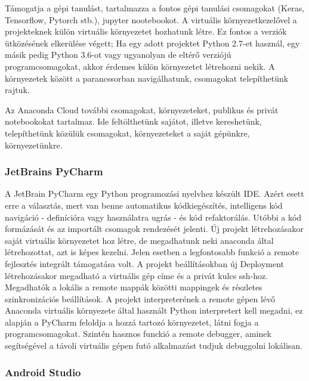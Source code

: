 Támogatja a gépi tanulást, tartalmazza a fontos gépi tanulási csomagokat (Keras, Tensorflow, Pytorch stb.), jupyter nootebookot. A virtuális környezetkezelővel a projekteknek külön virtuális környezetet hozhatunk létre. Ez fontos a verziók ütközésének elkerülése végett; Ha egy adott projektet Python 2.7-et használ, egy másik pedig Python 3.6-ot vagy ugyanolyan de eltérő verziójú programcsomagokat, akkor érdemes külön környezetet létrehozni nekik. A környezetek között a parancssorban navigálhatunk, csomagokat telepíthetünk rajtuk.

Az Anaconda Cloud további csomagokat, környezeteket, publikus és privát notebookokat tartalmaz. Ide feltölthetünk sajátot, illetve kereshetünk, telepíthetünk közülük csomagokat, környezeteket a saját gépünkre, környezetünkre.

\subsubsection{JetBrains PyCharm}

A JetBrain PyCharm egy Python programozási nyelvhez készült IDE. Azért esett erre a választás, mert van benne automatikus kódkiegészítés, intelligens kód navigáció - definícióra vagy használatra ugrás - és kód refaktorálás. Utóbbi a kód formázását és az importált csomagok rendezését jelenti.
\newline
\newline
Új projekt létrehozásakor saját virtuális környezetet hoz létre, de megadhatunk neki anaconda által létrehozottat, azt is képes kezelni. Jelen esetben a legfontosabb funkció a remote fejlesztés integrált támogatása volt.
\newline
\newline
A projekt beállításokban új Deployment létrehozásakor megadható a virtuális gép címe és a privát kulcs ssh-hoz. Megadhatók a lokális a remote mappák közötti mappingek és részletes szinkronizációs beállítások. A projekt interpreterének a remote gépen lévő Anaconda virtuális környezete által használt Python interpretert kell megadni, ez alapján a PyCharm feloldja a hozzá tartozó környezetet, látni fogja a programcsomagokat.
\newline
\newline
Szintén hasznos funckió a remote debugger, aminek segítségével a távoli virtuális gépen futó alkalmazást tudjuk debuggolni lokálisan.


\subsubsection{Android Studio}

